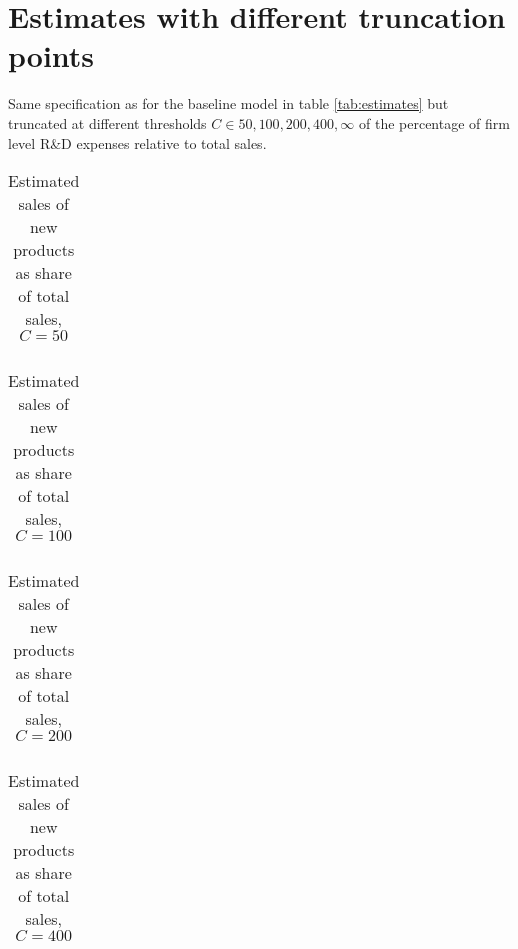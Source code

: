 \section{Estimates with different truncation points}
\label{app:thresholds}
\noindent
Same specification as for the baseline model in table \ref{tab:estimates} but truncated at different thresholds $C\in50,100,200,400,\infty$ of the percentage of firm level R\&D expenses relative to total sales.
\begin{table}[H]
  \vspace{-.cm}
  \centering
  \caption{Estimated sales of new products as share of total sales, $C=50$}
  \footnotesize
    \begin{tabular}{lcc}
    \toprule
        
    \end{tabular}
  \label{tab:est50}
  \vspace{-.5cm}
\end{table}

\begin{table}[H]
  \vspace{-.cm}
  \centering
  \caption{Estimated sales of new products as share of total sales, $C=100$}
  \footnotesize
    \begin{tabular}{lcc}
    \toprule
        
    \end{tabular}
  \label{tab:est100}
  \vspace{-.5cm}
\end{table}

\begin{table}[H]
  \vspace{-.cm}
  \centering
  \caption{Estimated sales of new products as share of total sales, $C=200$}
  \footnotesize
    \begin{tabular}{lcc}
    \toprule
        
    \end{tabular}
  \label{tab:est200}
  \vspace{-.5cm}
\end{table}

\begin{table}[H]
  \vspace{-.cm}
  \centering
  \caption{Estimated sales of new products as share of total sales, $C=400$}
  \footnotesize
    \begin{tabular}{lcc}
    \toprule
        
    \end{tabular}
  \label{tab:est400}
  \vspace{-.5cm}
\end{table}

